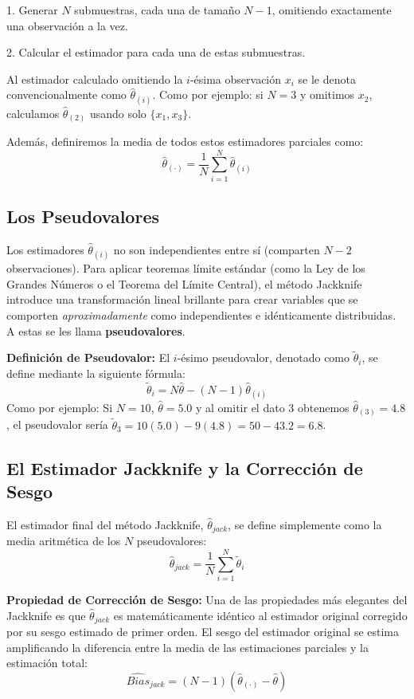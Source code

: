\documentclass[a4paper]{article}
\begin{document}
1. Generar $N$ submuestras, cada una de tamaño $N-1$, omitiendo exactamente una observación a la vez.

2. Calcular el estimador para cada una de estas submuestras.

Al estimador calculado omitiendo la $i$-ésima observación $x_i$ se le denota convencionalmente como $\hat{\theta}_{(i)}$. 
Como por ejemplo: si $N=3$ y omitimos $x_2$, calculamos $\hat{\theta}_{(2)}$ usando solo $\{x_1, x_3\}$.

Además, definiremos la media de todos estos estimadores parciales como:
$$ \hat{\theta}_{(\cdot)} = \frac{1}{N} \sum_{i=1}^N \hat{\theta}_{(i)} $$

\subsection{Los Pseudovalores}
Los estimadores $\hat{\theta}_{(i)}$ no son independientes entre sí (comparten $N-2$ observaciones). Para aplicar teoremas límite estándar (como la Ley de los Grandes Números o el Teorema del Límite Central), el método Jackknife introduce una transformación lineal brillante para crear variables que se comporten \textit{aproximadamente} como independientes e idénticamente distribuidas. A estas se les llama \textbf{pseudovalores}.

\textbf{Definición de Pseudovalor:} El $i$-ésimo pseudovalor, denotado como $\tilde{\theta}_i$, se define mediante la siguiente fórmula:
$$ \tilde{\theta}_i = N\hat{\theta} - (N-1)\hat{\theta}_{(i)} $$
Como por ejemplo: Si $N=10$, $\hat{\theta} = 5.0$ y al omitir el dato 3 obtenemos $\hat{\theta}_{(3)} = 4.8$, el pseudovalor sería $\tilde{\theta}_3 = 10(5.0) - 9(4.8) = 50 - 43.2 = 6.8$.

\subsection{El Estimador Jackknife y la Corrección de Sesgo}
El estimador final del método Jackknife, $\hat{\theta}_{jack}$, se define simplemente como la media aritmética de los $N$ pseudovalores:
$$ \hat{\theta}_{jack} = \frac{1}{N} \sum_{i=1}^N \tilde{\theta}_i $$

\textbf{Propiedad de Corrección de Sesgo:} Una de las propiedades más elegantes del Jackknife es que $\hat{\theta}_{jack}$ es matemáticamente idéntico al estimador original corregido por su sesgo estimado de primer orden. 
El sesgo del estimador original se estima amplificando la diferencia entre la media de las estimaciones parciales y la estimación total:
$$ \widehat{Bias}_{jack} = (N-1)(\hat{\theta}_{(\cdot)} - \hat{\theta}) $$
\end{document}
